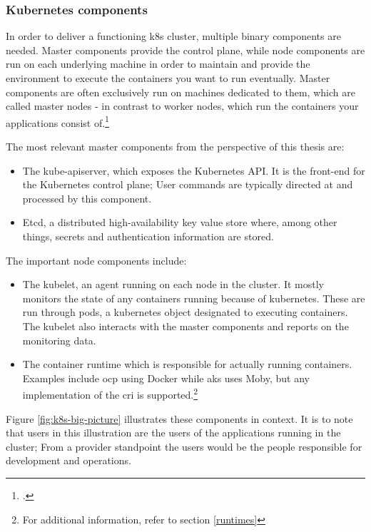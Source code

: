 \subsubsection{Kubernetes components}

In order to deliver a functioning \gls{k8s} cluster, multiple binary components are needed.
Master components provide the control plane, while node components are run on each underlying machine in order to maintain and provide the environment to execute the containers you want to run eventually.
Master components are often exclusively run on machines dedicated to them, which are called master nodes - in contrast to worker nodes, which run the containers your applications consist of.\footcite[][, section 'Master Components']{k8sComponents}

The most relevant master components from the perspective of this thesis are:
\begin{itemize}

\item The kube-apiserver, which exposes the Kubernetes API. It is the front-end for the Kubernetes control plane; User commands are typically directed at and processed by this component.

\item Etcd, a distributed high-availability key value store where, among other things, secrets and authentication information are stored.

\end{itemize}

The important node components include:
\begin{itemize}

\item The kubelet, an agent running on each node in the cluster. It mostly monitors the state of any containers running because of kubernetes. These are run through pods, a kubernetes object designated to executing containers. The kubelet also interacts with the master components and reports on the monitoring data.

\item The container runtime which is responsible for actually running containers. Examples include \gls{ocp} using Docker while \gls{aks} uses Moby, but any implementation of the \gls{cri} is supported.\footnote{For additional information, refer to section \ref{runtimes}} 

\end{itemize}

Figure \ref{fig:k8s-big-picture} illustrates these components in context. It is to note that users in this illustration are the users of the applications running in the cluster; From a provider standpoint the users would be the people responsible for development and operations.

